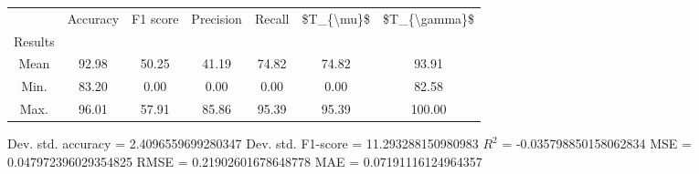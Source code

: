 \begin{tabular}{|c|c|c|c|c|c|c|}
\toprule
{} &  Accuracy &  F1 score &  Precision &  Recall &  \$T\_\{\textbackslash mu\}\$ &  \$T\_\{\textbackslash gamma\}\$ \\
Results &           &           &            &         &            &               \\
\hline
Mean    &     92.98 &     50.25 &      41.19 &   74.82 &      74.82 &         93.91 \\
Min.    &     83.20 &      0.00 &       0.00 &    0.00 &       0.00 &         82.58 \\
Max.    &     96.01 &     57.91 &      85.86 &   95.39 &      95.39 &        100.00 \\
\bottomrule
\end{tabular}

 Dev. std. accuracy = 2.4096559699280347
 Dev. std. F1-score = 11.293288150980983
 $R^2$ = -0.035798850158062834
 MSE = 0.047972396029354825
 RMSE = 0.21902601678648778
 MAE = 0.07191116124964357